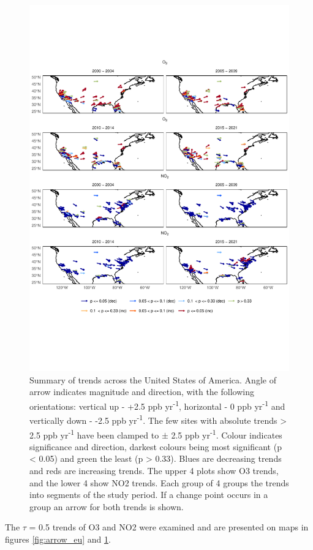 \documentclass[journal abbreviation, manuscript]{copernicus}
\begin{document}
\begin{figure}[p]
\includegraphics[width=12cm]{figures/f4_usa_arrows.pdf}
\caption{Summary of trends across the United States of America. Angle of arrow indicates magnitude and direction, with the following orientations: vertical up - +2.5 ppb yr\textsuperscript{-1}, horizontal - 0 ppb yr\textsuperscript{-1} and vertically down - -2.5 ppb yr\textsuperscript{-1}. The few sites with absolute trends > 2.5 ppb yr\textsuperscript{-1} have been clamped to $\pm$ 2.5 ppb yr\textsuperscript{-1}. Colour indicates significance and direction, darkest colours being most significant (p < 0.05) and green the least (p > 0.33). Blues are decreasing trends and reds are increasing trends. The upper 4 plots show O3 trends, and the lower 4 show NO2 trends. Each group of 4 groups the trends into segments of the study period. If a change point occurs in a group an arrow for both trends is shown.}
\label{fig:arrow_us}
\end{figure}

The $\tau$ = 0.5 trends of O3 and NO2 were examined and are presented on maps in figures \ref{fig:arrow_eu} and \ref{fig:arrow_us}.
\end{document}

